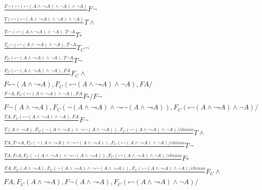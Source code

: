 \documentclass[a4paper,12pt, oneside]{book}
\begin{document}
\begin{esempio}
  {\small{
      \begin{gather*}
        \frac{F\neg(\square\neg(\square\neg(A\land\neg\square A)\land \neg
        A)\land \neg A)}{}F\neg\\
        \frac{T(\square\neg(\square\neg(A\land\neg\square A)\land \neg
        A)\land \neg A)}{}T\land\\
        \frac{T\square\neg(\square\neg(A\land\neg\square A)\land \neg
        A), T\neg A}{}T\square\\
        \frac{T_C\neg(\square\neg(A\land\neg\square A)\land \neg
        A), T\neg A}{}T_C\neg\\
        \frac{F_C(\square\neg(A\land\neg\square A)\land \neg
        A), T\neg A}{}T\neg\\
        \frac{F_C(\square\neg(A\land\neg\square A)\land \neg
        A), FA}{}F_C\land\\
        F\square\neg(A\land\neg\square A),F_C(\square\neg(A\land\neg\square
        A)\land \neg A), FA/\\
        \frac{F\neg A, F_C(\square\neg(A\land\neg\square A)\land \neg
        A), FA}{}F\square/F\neg\\
        F\neg(A\land\neg\square
        A),F_C(\neg(A\land\neg\square A)\land\neg\square\neg(A\land\neg\square
        A)), 
        F_C(\square\neg(A\land \neg\square A)\land \neg A)/\\
        \frac{TA,
        F_C(\square\neg(A\land\neg\square A)\land \neg 
        A), FA}{}F\neg\\
        \frac{T(A\land\neg\square
        A),F_C(\neg(A\land\neg\square A)\land\neg\square\neg(A\land\neg\square
        A)), 
        F_C(\square\neg(A\land \neg\square A)\land \neg A)/chiuso}{}T\land\\
        \frac{TA, T\neg\square A,F_C(\neg(A\land\neg\square
        A)\land\neg\square\neg(A\land\neg\square A)), F_C(\square\neg(A\land
        \neg\square A)\land \neg A)/chiuso}{} T\neg\\
        \frac{TA, F\square A,F_C(\neg(A\land\neg\square
        A)\land\neg\square\neg(A\land\neg\square A)), F_C(\square\neg(A\land
        \neg\square A)\land \neg A)/chiuso}{} F\square\\
        \frac{FA, F_C(A\land\neg\square A),F_C(\neg(A\land\neg\square
        A)\land\neg\square\neg(A\land\neg\square A)), F_C(\square\neg(A\land
        \neg\square A)\land \neg A)/chiuso}{} F_C\land\\
        FA, F_C(A\land\neg\square A),F\neg(A\land\neg\square
        A), F_C(\square\neg(A\land\neg\square A)\land \neg A)/\\

\end{gather*}}}
\end{esempio}
\end{document}
